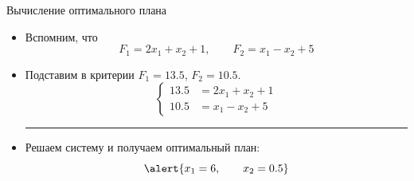 \documentclass[unicode,11pt,notheorems,xcolor=table]{beamer}
\begin{document}
\begin{frame}{Вычисление оптимального плана}
    \begin{itemize}
        \item Вспомним, что 
        $$
        F_1 = 2x_1 + x_2 + 1,\qquad F_2 = x_1 - x_2 + 5
        $$
        
        \item Подставим в критерии $F_1=13.5$, $F_2=10.5$.
        $$
        \left\lbrace
        \begin{aligned}
            13.5 &= 2x_1 + x_2 + 1\\
            10.5 &= x_1 - x_2 + 5    
        \end{aligned}
        \right.
        $$
        
        \medskip
        \hrule
        \medskip

        \item Решаем систему и получаем оптимальный план: 
        $$
            \alert{
            x_1 = 6,
            \qquad
            x_2 = 0.5
            }
        $$
    \end{itemize}
\end{frame}
\end{document}
